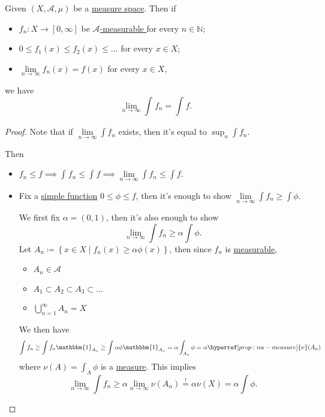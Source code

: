 \begin{theorem}\label{thm:MCT}
	Given \((X, \mathcal{A}, \mu)\) be a \hyperref[def:measure-space]{measure space}. Then if
	\begin{itemize}
		\item \(f_{n}\colon X\to [0, \infty ]\) be \hyperref[def:A-measurable-function]{\(\mathcal{A}\)-measurable } for every \(n\in\mathbb{N} \);
		\item \(0\leq f_1(x)\leq f_2(x)\leq \dots  \) for every \(x\in X\);
		\item \(\lim\limits_{n \to \infty} f_{n}(x) = f(x)\) for every \(x\in X\),
	\end{itemize}
	we have
	\[
		\lim\limits_{n \to \infty} \int_{}^{} f_{n} = \int_{}^{} f.
	\]
\end{theorem}
\begin{proof}
	Note that if \(\lim\limits_{n \to \infty} \int f_{n}\) exists, then it's equal to \(\sup _n \int f_{n}\).

	\par Then
	\begin{itemize}
		\item \(f_{n}\leq f \implies \int_{}^{} f_{n}\leq \int_{}^{} f\implies \lim\limits_{n \to \infty} \int f_{n}\leq \int f\).
		\item Fix a \hyperref[def:simple-function]{simple function} \(0\leq \phi \leq f\), then it's enough to show \(\lim\limits_{n \to \infty} \int f_{n}\geq \int \phi \).
		      \par We first fix \(\alpha = (0, 1)\), then it's also enough to show
		      \[
			      \lim\limits_{n \to \infty} \int f_{n}\geq \alpha \int \phi.
		      \]
		      Let \(A_{n} \coloneqq \left\{x\in X\mid f_{n}(x) \geq \alpha \phi (x)\right\}\), then since \(f_{n}\) is \hyperref[def:measurable-function]{measurable},
		      \begin{itemize}
			      \item \(A_{n}\in \mathcal{A} \)
			      \item \(A_1\subset A_2\subset A_3\subset\dots  \)
			      \item \(\bigcup\limits_{n=1}^{\infty} A_{n} = X\) 
		      \end{itemize}
		      We then have
		      \[
			      \int f_{n}\geq \int f_{n}\mathbbm{1}_{A_{n}} \geq \int \alpha \phi \mathbbm{1}_{A_{n}} = \alpha \int_{A_{n}}\phi = \alpha \hyperref[prop:nu-measure]{\nu} (A_{n})
		      \]
		      where \(\hyperref[prop:nu-measure]{\nu}(A) = \int_{A}^{} \phi \) is a \hyperref[def:measure]{measure}. This implies
		      \[
			      \lim\limits_{n \to \infty} \int f_{n}\geq \alpha \lim\limits_{n \to \infty} \hyperref[prop:nu-measure]{\nu } (A_{n}) \overset{\hyperref[thm:measure-space-continuity-from-below]{!}}{=} \alpha \hyperref[prop:nu-measure]{\nu}(X) = \alpha \int \phi.
		      \]
	\end{itemize}
\end{proof}

